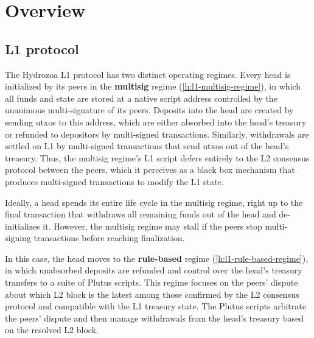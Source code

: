 \documentclass[../hydrozoa.tex]{subfiles}
\begin{document}
\chapter*{Overview}%
\label{h:introduction}

\section*{L1 protocol}%
\label{h:l1-protocol}

The Hydrozoa L1 protocol has two distinct operating regimes.
Every head is initialized by its peers in the \textbf{multisig} regime (\cref{h:l1-multisig-regime}), in which all funds and state are stored at a native script address controlled by the unanimous multi-signature of its peers.
Deposits into the head are created by sending utxos to this address, which are either absorbed into the head's treasury or refunded to depositors by multi-signed transactions.
Similarly, withdrawals are settled on L1 by multi-signed transactions that send utxos out of the head's treasury.
Thus, the multisig regime's L1 script defers entirely to the L2 consensus protocol between the peers, which it perceives as a black box mechanism that produces multi-signed transactions to modify the L1 state.

Ideally, a head spends its entire life cycle in the multisig regime, right up to the final transaction that withdraws all remaining funds out of the head and de-initializes it.
However, the multisig regime may stall if the peers stop multi-signing transactions before reaching finalization.

In this case, the head moves to the \textbf{rule-based} regime (\cref{h:l1-rule-based-regime}), in which unabsorbed deposits are refunded and control over the head's treasury transfers to a suite of Plutus scripts. 
This regime focuses on the peers' dispute about which L2 block is the latest among those confirmed by the L2 consensus protocol and compatible with the L1 treasury state.
The Plutus scripts arbitrate the peers' dispute and then manage withdrawals from the head's treasury based on the resolved L2 block.

\end{document}
